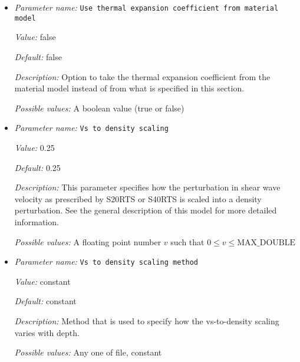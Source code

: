 \begin{itemize}
{\it Default:} 2e-5


{\it Description:} The value of the thermal expansion coefficient $\beta$. Units: $1/K$.


{\it Possible values:} A floating point number $v$ such that $0 \leq v \leq \text{MAX\_DOUBLE}$
\item {\it Parameter name:} {\tt Use thermal expansion coefficient from material model}
\label{parameters:Initial temperature model/S40RTS perturbation/Use thermal expansion coefficient from material model}
\label{parameters:Initial_20temperature_20model/S40RTS_20perturbation/Use_20thermal_20expansion_20coefficient_20from_20material_20model}


{\it Value:} false


{\it Default:} false


{\it Description:} Option to take the thermal expansion coefficient from the material model instead of from what is specified in this section.


{\it Possible values:} A boolean value (true or false)
\item {\it Parameter name:} {\tt Vs to density scaling}
\label{parameters:Initial temperature model/S40RTS perturbation/Vs to density scaling}
\label{parameters:Initial_20temperature_20model/S40RTS_20perturbation/Vs_20to_20density_20scaling}


{\it Value:} 0.25


{\it Default:} 0.25


{\it Description:} This parameter specifies how the perturbation in shear wave velocity as prescribed by S20RTS or S40RTS is scaled into a density perturbation. See the general description of this model for more detailed information.


{\it Possible values:} A floating point number $v$ such that $0 \leq v \leq \text{MAX\_DOUBLE}$
\item {\it Parameter name:} {\tt Vs to density scaling method}
\label{parameters:Initial temperature model/S40RTS perturbation/Vs to density scaling method}
\label{parameters:Initial_20temperature_20model/S40RTS_20perturbation/Vs_20to_20density_20scaling_20method}


{\it Value:} constant


{\it Default:} constant


{\it Description:} Method that is used to specify how the vs-to-density scaling varies with depth.


{\it Possible values:} Any one of file, constant
\end{itemize}



